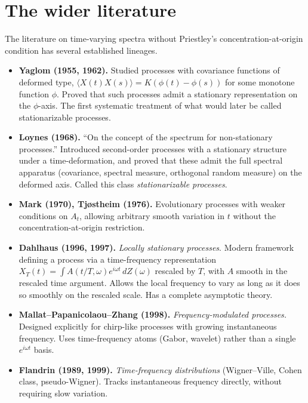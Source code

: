 \documentclass[11pt]{amsart}
\theoremstyle{plain}
\begin{document}
\section{The wider literature}

The literature on time-varying spectra without Priestley's concentration-at-origin condition has several established lineages.

\begin{itemize}
\item \textbf{Yaglom (1955, 1962).} Studied processes with covariance functions of deformed type, $\langle X(t)X(s)\rangle = K(\phi(t) - \phi(s))$ for some monotone function $\phi$. Proved that such processes admit a stationary representation on the $\phi$-axis. The first systematic treatment of what would later be called stationarizable processes.

\item \textbf{Loynes (1968).} ``On the concept of the spectrum for non-stationary processes.'' Introduced second-order processes with a stationary structure under a time-deformation, and proved that these admit the full spectral apparatus (covariance, spectral measure, orthogonal random measure) on the deformed axis. Called this class \emph{stationarizable processes}.

\item \textbf{Mark (1970), Tj{\o}stheim (1976).} Evolutionary processes with weaker conditions on $A_t$, allowing arbitrary smooth variation in $t$ without the concentration-at-origin restriction.

\item \textbf{Dahlhaus (1996, 1997).} \emph{Locally stationary processes}. Modern framework defining a process via a time-frequency representation $X_T(t) = \int A(t/T, \omega) e^{i\omega t}\, dZ(\omega)$ rescaled by $T$, with $A$ smooth in the rescaled time argument. Allows the local frequency to vary as long as it does so smoothly on the rescaled scale. Has a complete asymptotic theory.

\item \textbf{Mallat--Papanicolaou--Zhang (1998).} \emph{Frequency-modulated processes.} Designed explicitly for chirp-like processes with growing instantaneous frequency. Uses time-frequency atoms (Gabor, wavelet) rather than a single $e^{i\omega t}$ basis.

\item \textbf{Flandrin (1989, 1999).} \emph{Time-frequency distributions} (Wigner--Ville, Cohen class, pseudo-Wigner). Tracks instantaneous frequency directly, without requiring slow variation.
\end{itemize}
\end{document}

